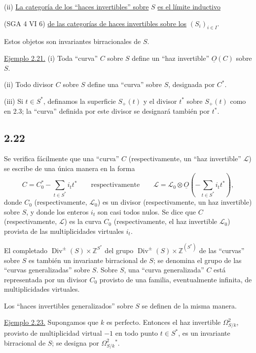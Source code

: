 \noindent (ii) \underline{La categoría de los ``haces invertibles'' sobre} $S$
\underline{es el límite inductivo}

\pageoriginale

(SGA 4 VI 6) \underline{de las categorías de haces invertibles sobre los}
$(S_i)_{i\in I}$.

Estos objetos son invariantes birracionales de $S$.

\medskip
\noindent\underline{Ejemplo 2.21.}
(i) Toda ``curva'' $C$ sobre $S$ define un ``haz invertible''
$\underline{O}(C)$ sobre $S$.

\noindent (ii) Todo divisor $C$ sobre $S$ define una ``curva'' sobre $S$,
designada por $C^*$.

\noindent (iii) Si $t\in S^*$, definamos la superficie $S_+(t)$ y el divisor
$t^*$ sobre $S_+(t)$ como en 2.3; la ``curva'' definida por este divisor se
designará también por $t^*$.

\subsection*{2.22}
Se verifica fácilmente que una ``curva'' $C$ (respectivamente, un ``haz
invertible'' $\mathcal L$) se escribe de una única manera en la forma
\begin{equation*}
C=C_0^*-\sum_{t\in S^*}i_t t^*
\qquad\text{respectivamente}\qquad
\mathcal L=\mathcal L_0\otimes\underline{O}
\left(-\sum_{t\in S^*}i_t t^*\right),
\end{equation*}
donde $C_0$ (respectivamente, $\mathcal L_0$) es un divisor (respectivamente,
un haz invertible) sobre $S$, y donde los enteros $i_t$ son casi todos nulos.
Se dice que $C$ (respectivamente, $\mathcal L$) es la curva $C_0$
(respectivamente, el haz invertible $\mathcal L_0$) provista de las
multiplicidades virtuales $i_t$.

El completado $\operatorname{Div}^{\pm}(S)\times\mathbb Z^{S^*}$ del grupo
$\operatorname{Div}^{\pm}(S)\times\mathbb Z^{(S^*)}$ de las ``curvas'' sobre
$S$ es también un invariante birracional de $S$; se denomina el grupo de las
``curvas generalizadas'' sobre $S$. Sobre $S$, una ``curva generalizada'' $C$
está representada por un divisor $C_0$ provisto de una familia, eventualmente
infinita, de multiplicidades virtuales.

Los ``haces invertibles generalizados'' sobre $S$ se definen de la misma manera.

\pageoriginale

\medskip
\noindent\underline{Ejemplo 2.23.}
Supongamos que $k$ es perfecto. Entonces el haz invertible
$\Omega^2_{S/k}$, provisto de multiplicidad virtual $-1$ en todo punto
$t\in S^*$, es un invariante birracional de $S$; se designa por
$\Omega^2_{S/k}{}^*$.

